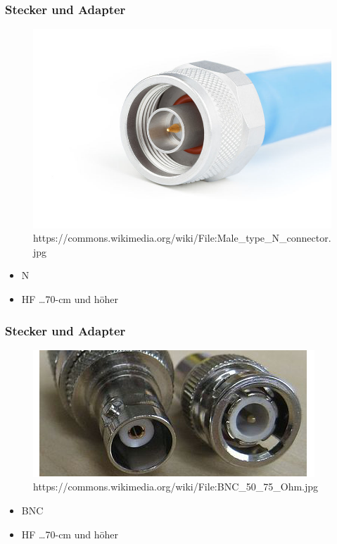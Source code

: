 \begin{frame}
  \frametitle{Stecker und Adapter}
  \begin{center}
    \begin{figure}
      \includegraphics[width=.6\textwidth,height=.6\textheight,keepaspectratio]{e10/n.jpg}
                    {https://commons.wikimedia.org/wiki/File:Male_type_N_connector.jpg}{\ccbysa}
    \end{figure}
    \begin{itemize}
      \item N
      \item HF \dots 70-cm und höher
    \end{itemize}
  \end{center}
\end{frame}

\begin{frame}
  \frametitle{Stecker und Adapter}
  \begin{center}
    \begin{figure}
      \includegraphics[width=.6\textwidth,height=.7\textheight,keepaspectratio]{e10/bnc.jpg}
                    {https://commons.wikimedia.org/wiki/File:BNC_50_75_Ohm.jpg}{\ccbysa}
    \end{figure}
    \begin{itemize}
      \item BNC
      \item HF \dots 70-cm und höher
    \end{itemize}

  \end{center}
\end{frame}

